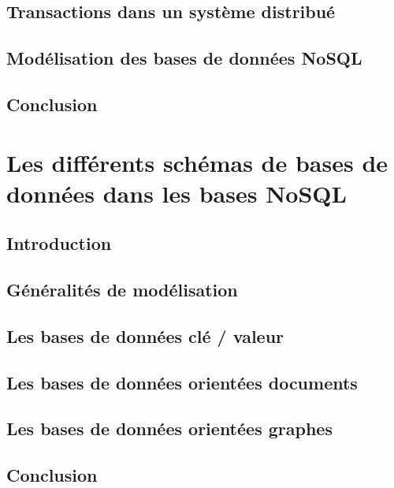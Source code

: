 \documentclass[12pt,titlepage,a4paper]{report}
\begin{document}
		\section{Transactions dans un système distribué}
			

		\section{Modélisation des bases de données NoSQL}
			

		\section*{Conclusion}
			

	\chapter{Les différents schémas de bases de données dans les bases NoSQL}
	\minitoc

		\section*{Introduction}
			

		\section{Généralités de modélisation}
			

		\section{Les bases de données clé / valeur}
			

		\section{Les bases de données orientées documents}
		\label{sec:BDDDocuments}
      

		\section{Les bases de données orientées graphes}
		\label{sec:BDDGraphes}
			

		\section*{Conclusion}
			

	
	
\end{document}
